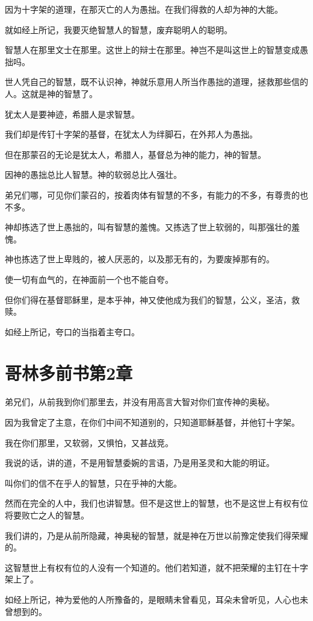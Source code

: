 \documentclass[12pt,oneside]{book}
\begin{document}
因为十字架的道理，在那灭亡的人为愚拙。在我们得救的人却为神的大能。

就如经上所记，我要灭绝智慧人的智慧，废弃聪明人的聪明。

智慧人在那里文士在那里。这世上的辩士在那里。神岂不是叫这世上的智慧变成愚拙吗。

世人凭自己的智慧，既不认识神，神就乐意用人所当作愚拙的道理，拯救那些信的人。这就是神的智慧了。

犹太人是要神迹，希腊人是求智慧。

我们却是传钉十字架的基督，在犹太人为绊脚石，在外邦人为愚拙。

但在那蒙召的无论是犹太人，希腊人，基督总为神的能力，神的智慧。

因神的愚拙总比人智慧。神的软弱总比人强壮。

弟兄们哪，可见你们蒙召的，按着肉体有智慧的不多，有能力的不多，有尊贵的也不多。

神却拣选了世上愚拙的，叫有智慧的羞愧。又拣选了世上软弱的，叫那强壮的羞愧。

神也拣选了世上卑贱的，被人厌恶的，以及那无有的，为要废掉那有的。

使一切有血气的，在神面前一个也不能自夸。

但你们得在基督耶稣里，是本乎神，神又使他成为我们的智慧，公义，圣洁，救赎。

如经上所记，夸口的当指着主夸口。

\chapter{哥林多前书第2章}
弟兄们，从前我到你们那里去，并没有用高言大智对你们宣传神的奥秘。

因为我曾定了主意，在你们中间不知道别的，只知道耶稣基督，并他钉十字架。

我在你们那里，又软弱，又惧怕，又甚战竞。

我说的话，讲的道，不是用智慧委婉的言语，乃是用圣灵和大能的明证。

叫你们的信不在乎人的智慧，只在乎神的大能。

然而在完全的人中，我们也讲智慧。但不是这世上的智慧，也不是这世上有权有位将要败亡之人的智慧。

我们讲的，乃是从前所隐藏，神奥秘的智慧，就是神在万世以前豫定使我们得荣耀的。

这智慧世上有权有位的人没有一个知道的。他们若知道，就不把荣耀的主钉在十字架上了。

如经上所记，神为爱他的人所豫备的，是眼睛未曾看见，耳朵未曾听见，人心也未曾想到的。
\end{document}
